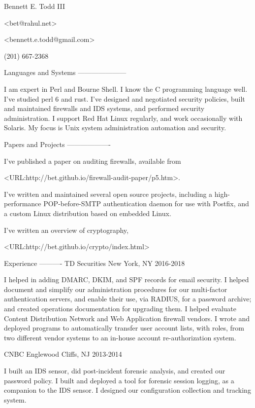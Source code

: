 \documentclass{article}
\begin{document}
\frenchspacing

\begin{center}
Bennett E. Todd III

\textless bet@rahul.net\textgreater

\textless bennett.e.todd@gmail.com\textgreater

(201) 667-2368
\end{center}

Languages and Systems
---------------------

I am expert in Perl and Bourne Shell. I know the C programming
language well. I've studied perl 6 and rust. I've designed and
negotiated security policies, built and maintained firewalls and IDS
systems, and performed security administration. I support Red Hat
Linux regularly, and work occasionally with Solaris. My focus is
Unix system administration automation and security.

Papers and Projects
-------------------

I've published a paper on auditing firewalls, available from

\textless URL:http://bet.github.io/firewall-audit-paper/p5.htm\textgreater.

I've
written and maintained several open source projects, including a
high-performance POP-before-SMTP authentication daemon for use with
Postfix, and a custom Linux distribution based on embedded Linux.

I've written an overview of cryptography,

\textless URL:http://bet.github.io/crypto/index.html\textgreater

Experience
----------
TD Securities \hfill New York, NY
2016-2018

I helped in adding DMARC, DKIM, and SPF records for email
security. I helped document and simplify our administration
procedures for our multi-factor authentication servers, and
enable their use, via RADIUS, for a password archive; and created
operations documentation for upgrading them. I helped evaluate
Content Distribution Network and Web Application firewall vendors.
I wrote and deployed programs to automatically transfer user
account lists, with roles, from two different vendor systems to an
in-house account re-authorization system.

CNBC \hfill Englewood Cliffs, NJ
2013-2014

I built an IDS sensor, did post-incident forensic analysis, and
created our password policy. I built and deployed a tool for forensic
session logging, as a companion to the IDS sensor. I designed our
configuration collection and tracking system.
\end{document}
